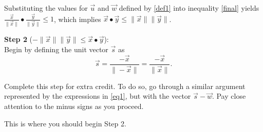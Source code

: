 \documentclass[11pt]{article}
\begin{document}
Substituting the values for $\vec{u}$ and $\vec{w}$ defined by \eqref{def1} 
into inequality \eqref{final} yields $\frac{\vec{x}}{\|\vec{x}\|} \bullet 
\frac{\vec{y}}{\|\vec{y}\|} \le 1$, which implies $\vec{x} \bullet \vec{y} 
\le \|\vec{x}\| \|\vec{y}\|$.

\textbf{Step 2} ($-\|\vec{x}\| \|\vec{y}\| \le \vec{x} \bullet \vec{y}$):\\
Begin by defining the unit vector $\vec{s}$ as
$$\vec{s} = \frac{-\vec{x}}{\|-\vec{x}\|} = \frac{-\vec{x}}{\|\vec{x}\|}.$$

Complete this step for extra credit. To do so, go through a similar argument 
represented by the expressions in \eqref{eq1}, but with the vector $\vec{s}-\vec{w}$. 
Pay close attention to the minus signs as you proceed.

\clearpage

This is where you should begin Step 2.
\end{document}
